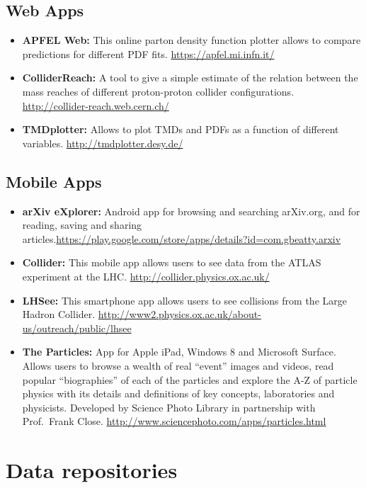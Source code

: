 \subsection{Web Apps}\label{databases:subsec:webapps}

\begin{itemize}
\item
  \textbf{APFEL Web:} This online parton density function plotter allows
  to compare predictions for different PDF fits.
  \url{https://apfel.mi.infn.it/}
\item
  \textbf{ColliderReach:} A tool to give a simple estimate of the
  relation between the mass reaches of different proton-proton collider
  configurations. \url{http://collider-reach.web.cern.ch/}
\item
  \textbf{TMDplotter:} Allows to plot TMDs and PDFs as a function of
  different variables. \url{http://tmdplotter.desy.de/}
\end{itemize}

\subsection{Mobile Apps}\label{databases:subsec:mobileapps}

\begin{itemize}
\item
  \textbf{arXiv eXplorer:} Android app for browsing and searching
  arXiv.org, and for reading, saving and sharing
  articles.\url{https://play.google.com/store/apps/details?id=com.gbeatty.arxiv}
\item
  \textbf{Collider:} This mobile app allows users to see data from the
  ATLAS experiment at the LHC. \url{http://collider.physics.ox.ac.uk/}
\item
  \textbf{LHSee:} This smartphone app allows users to see collisions
  from the Large Hadron Collider.
  \url{http://www2.physics.ox.ac.uk/about-us/outreach/public/lhsee}
\item
  \textbf{The Particles:} App for Apple iPad, Windows 8 and Microsoft
  Surface. Allows users to browse a wealth of real ``event'' images and
  videos, read popular ``biographies'' of each of the particles and
  explore the A-Z of particle physics with its details and definitions
  of key concepts, laboratories and physicists. Developed by Science
  Photo Library in partnership with Prof.~Frank Close.
  \url{http://www.sciencephoto.com/apps/particles.html}
\end{itemize}

\section{Data repositories}\label{databases:sec:datarepositories}

